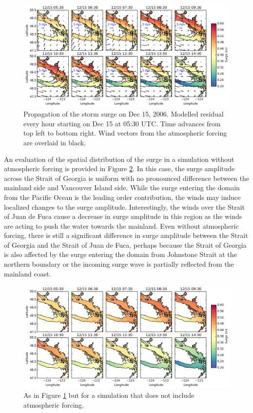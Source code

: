 \documentclass[pdftex,10pt]{article}
\begin{document}
\begin{figure}
\centering
\includegraphics[scale=0.6]{Figures/dec2006_spatial.pdf}
\caption{Propagation of the storm surge on Dec 15, 2006. Modelled residual every hour starting on Dec 15 at 05:30 UTC. Time advances from top left to bottom right. Wind vectors from the atmospheric forcing are overlaid in black.}
\label{fig:spatial}
\end{figure}

An evaluation of the spatial distribution of the surge in a simulation without atmospheric forcing is provided in Figure \ref{fig:spatial_sshonly}. In this case, the surge amplitude across the Strait of Georgia is uniform with no pronounced difference between the mainland side and Vancouver Island side. While the surge entering the domain from the Pacific Ocean is the leading order contribution, the winds may induce localized changes to the surge amplitude. Interestingly, the winds over the Strait of Juan de Fuca cause a decrease in surge amplitude in this region as the winds are acting to push the water towards the mainland.  Even without atmospheric forcing, there is still a significant difference in surge amplitude between the Strait of Georgia and the Strait of Juan de Fuca, perhaps because the Strait of Georgia is also affected by the surge entering the domain from Johnstone Strait at the northern boundary or the incoming surge wave is partially reflected from the mainland coast. 

\begin{figure}
\centering
\includegraphics[scale=0.6]{Figures/dec2006_spatial_sshonly.pdf}
\caption{As in Figure \ref{fig:spatial} but for a simulation that does not include atmospheric forcing. }
\label{fig:spatial_sshonly}
\end{figure}
\end{document}
